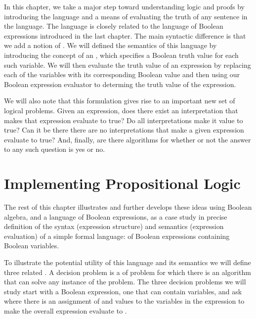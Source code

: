 \documentclass[letterpaper,10pt,english]{sphinxmanual}
\begin{document}
In this chapter, we take a major step toward understanding logic and
proofs by introducing the language  and a means
of evaluating the truth of any sentence in the language. The language
is closely related to the language of Boolean expressions introduced
in the last chapter. The main syntactic difference is that we add a
notion of . We will defined the semantics of
this language by introducing the concept of an , which
specifies a Boolean truth value for each such variable. We will then
evaluate the truth value of an expression  by replacing each of the
variables with its corresponding Boolean value and then using our
Boolean expression evaluator to determing the truth value of the
expression.

We will also note that this formulation gives rise to an important new
set of logical problems. Given an expression, does there exist an
interpretation that makes that expression evaluate to true? Do all
interpretations make it value to true? Can it be there there are no
interpretations that make a given expression evaluate to true?  And,
finally, are there  algorithms for  whether or
not the answer to any such question is yes or no.


\section{Implementing Propositional Logic}
\label{\detokenize{09-propositional-logic:implementing-propositional-logic}}
The rest of this chapter illustrates and further develops these ideas
using Boolean algebra, and a language of Boolean expressions, as a
case study in precise definition of the syntax (expression structure)
and semantics (expression evaluation) of a simple formal language: of
Boolean expressions containing Boolean variables.

To illustrate the potential utility of this language and its semantics
we will define three related . A decision problem
is a  of problem for which there is an algorithm that can solve
any instance of the problem. The three decision problems we will study
start with a Boolean expression, one that can contain variables, and
ask where there is an assignment of  and  values to the
variables in the expression to make the overall expression evaluate to
.
\end{document}
